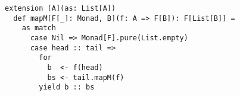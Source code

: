 \begin{algorithm}

\begin{verbatim}
extension [A](as: List[A])
  def mapM[F[_]: Monad, B](f: A => F[B]): F[List[B]] =
    as match
      case Nil => Monad[F].pure(List.empty)
      case head :: tail =>
        for
          b  <- f(head)
          bs <- tail.mapM(f)
        yield b :: bs
\end{verbatim}

\caption{Monadic  function for  in Scala. %
\label{monad:mapm}}
\end{algorithm}
